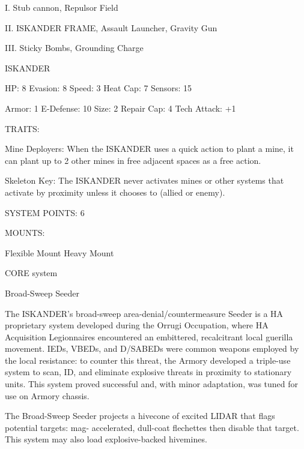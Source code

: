 I. Stub cannon, Repulsor Field
 
II. ISKANDER FRAME, Assault Launcher, Gravity Gun
 
III. Sticky Bombs, Grounding Charge
 

                                                ISKANDER 

 HP: 8          Evasion: 8                            Speed: 3           Heat Cap: 7        Sensors: 15 

 Armor: 1       E-Defense: 10                         Size: 2            Repair Cap: 4      Tech Attack:  
                                                                                            +1 

                                                  TRAITS: 

 Mine Deployers: When the ISKANDER uses a quick action to plant a mine, it can plant up to 2 other  
 mines in free adjacent spaces as a free action.
 
 Skeleton Key: The ISKANDER never activates mines or other systems that activate by proximity unless  
 it chooses to (allied or enemy). 

                                            SYSTEM POINTS: 6 

                                                  MOUNTS: 

 Flexible Mount                    Heavy Mount 

                                               CORE system 

                                                                                                            


                                             Broad-Sweep Seeder  

 The ISKANDER’s broad-sweep area-denial/countermeasure Seeder is a HA proprietary system  
 developed during the Orrugi Occupation, where HA Acquisition Legionnaires encountered an  
 embittered, recalcitrant local guerilla movement. IEDs, VBEDs, and D/SABEDs were common weapons  
 employed by the local resistance: to counter this threat, the Armory developed a triple-use system to  
 scan, ID, and eliminate explosive threats in proximity to stationary units. This system proved successful  
 and, with minor adaptation, was tuned for use on Armory chassis.   

 The Broad-Sweep Seeder projects a hivecone of excited LIDAR that flags potential targets: mag- 
 accelerated, dull-coat flechettes then disable that target. This system may also load explosive-backed  
 hivemines.   

